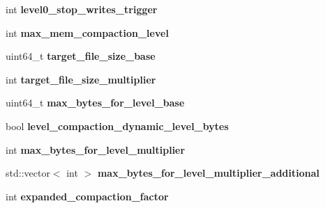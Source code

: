 \begin{DoxyCompactItemize}
\item 
int {\bfseries level0\+\_\+stop\+\_\+writes\+\_\+trigger}\hypertarget{structrocksdb_1_1ColumnFamilyOptions_a2e12bced5ac5c71a218c4ed54bc4e869}{}\label{structrocksdb_1_1ColumnFamilyOptions_a2e12bced5ac5c71a218c4ed54bc4e869}

\item 
int {\bfseries max\+\_\+mem\+\_\+compaction\+\_\+level}\hypertarget{structrocksdb_1_1ColumnFamilyOptions_ab34f7e86a0a89ec8afce212064c40e12}{}\label{structrocksdb_1_1ColumnFamilyOptions_ab34f7e86a0a89ec8afce212064c40e12}

\item 
uint64\+\_\+t {\bfseries target\+\_\+file\+\_\+size\+\_\+base}\hypertarget{structrocksdb_1_1ColumnFamilyOptions_a3f7bdb70864f2e4b8c210d741a846ca4}{}\label{structrocksdb_1_1ColumnFamilyOptions_a3f7bdb70864f2e4b8c210d741a846ca4}

\item 
int {\bfseries target\+\_\+file\+\_\+size\+\_\+multiplier}\hypertarget{structrocksdb_1_1ColumnFamilyOptions_a9d29f960f7bf70d74eec3408e5e15d67}{}\label{structrocksdb_1_1ColumnFamilyOptions_a9d29f960f7bf70d74eec3408e5e15d67}

\item 
uint64\+\_\+t {\bfseries max\+\_\+bytes\+\_\+for\+\_\+level\+\_\+base}\hypertarget{structrocksdb_1_1ColumnFamilyOptions_a18bbb667e528c748a6fbd57e402886d8}{}\label{structrocksdb_1_1ColumnFamilyOptions_a18bbb667e528c748a6fbd57e402886d8}

\item 
bool {\bfseries level\+\_\+compaction\+\_\+dynamic\+\_\+level\+\_\+bytes}\hypertarget{structrocksdb_1_1ColumnFamilyOptions_a21d3d9d419bdb9575e5f457a5f976a38}{}\label{structrocksdb_1_1ColumnFamilyOptions_a21d3d9d419bdb9575e5f457a5f976a38}

\item 
int {\bfseries max\+\_\+bytes\+\_\+for\+\_\+level\+\_\+multiplier}\hypertarget{structrocksdb_1_1ColumnFamilyOptions_a4a8ec61f7c6b3b2ff45edd86bc991c00}{}\label{structrocksdb_1_1ColumnFamilyOptions_a4a8ec61f7c6b3b2ff45edd86bc991c00}

\item 
std\+::vector$<$ int $>$ {\bfseries max\+\_\+bytes\+\_\+for\+\_\+level\+\_\+multiplier\+\_\+additional}\hypertarget{structrocksdb_1_1ColumnFamilyOptions_a9cfc4724c3f55e7aeb8d581c4105e82c}{}\label{structrocksdb_1_1ColumnFamilyOptions_a9cfc4724c3f55e7aeb8d581c4105e82c}

\item 
int {\bfseries expanded\+\_\+compaction\+\_\+factor}\hypertarget{structrocksdb_1_1ColumnFamilyOptions_a300d8055fca9135f5fb798ae8ef3e479}{}\label{structrocksdb_1_1ColumnFamilyOptions_a300d8055fca9135f5fb798ae8ef3e479}


\end{DoxyCompactItemize}
